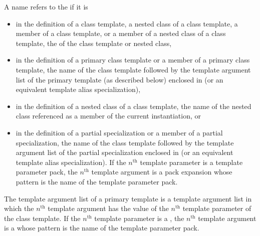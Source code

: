 \pnum
A name refers to the
if it is
\begin{itemize}
\item
in the definition of a class template, a nested class of a class template,
a member of a class template, or a member of a nested class of a class template,
the  of the class template or nested class,
\item
in the definition of a primary class template
or a member of a primary class template, the name of the
class template followed by the template argument list of the
primary template (as described below) enclosed in
\tcode{<>} (or an equivalent template alias specialization),
\item
in the definition of a nested class of a class template,
the name of the nested class referenced as a member of the
current instantiation, or
\item
in the definition of a partial specialization
or a member of a partial specialization, the name of
the class template followed by the template argument list of
the partial specialization enclosed in
\tcode{<>} (or an equivalent template alias specialization).
If the $n^\text{th}$ template parameter is
a template parameter pack, the $n^\text{th}$ template argument is a pack
expansion whose pattern is the name of
the template parameter pack.
\end{itemize}

\pnum
The template argument list of a primary template is a
template argument list in which the
$n^\text{th}$
template argument has the value of the
$n^\text{th}$
template parameter of the class template.
If the $n^\text{th}$ template parameter is a
, the $n^\text{th}$ template argument is a
 whose pattern is the name of
the template parameter pack.

